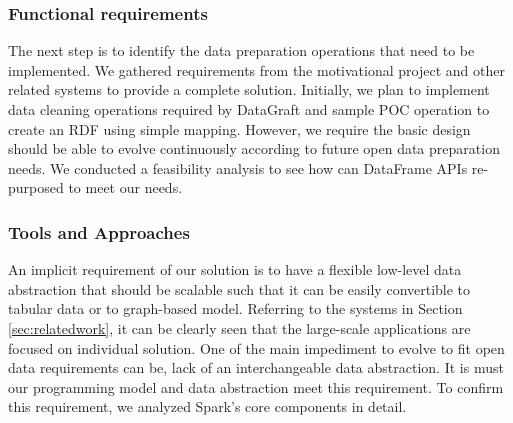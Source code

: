 \subsubsection{Functional requirements}
The next step is to identify the data preparation operations that need to be implemented. We gathered requirements from the motivational project and other related systems to provide a complete solution. Initially, we plan to implement data cleaning operations required by DataGraft and sample POC operation to create an RDF using simple mapping. However, we require the basic design should be able to evolve continuously according to future open data preparation needs. We conducted a feasibility analysis to see how can DataFrame APIs re-purposed to meet our needs. 
\subsubsection{Tools and Approaches}
An implicit requirement of our solution is to have a flexible low-level data abstraction that should be scalable such that it can be easily convertible to tabular data or to graph-based model. Referring to the systems in Section \ref{sec:relatedwork}, it can be clearly seen that the large-scale applications are focused on individual solution. One of the main impediment to evolve to fit open data requirements can be, lack of an interchangeable data abstraction. It is must our programming model and data abstraction meet this requirement. To confirm this requirement, we analyzed Spark's core components in detail. 
